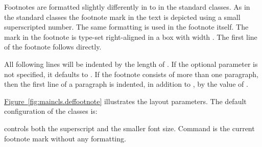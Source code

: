 \begin{Declaration}
\end{Declaration}%
Footnotes are formatted slightly differently in {\KOMAScript} to in the
standard classes. As in the standard classes the footnote mark in the text is
depicted using a small superscripted number. The same formatting is used in
the footnote itself. The mark in the footnote is type-set right-aligned in a
box with width . The first line of the footnote follows
directly.

All following lines will be indented by the length of . If the
optional parameter  is not specified, it defaults to
.  If the footnote consists of more than one paragraph, then the
first line of a paragraph is indented, in addition to , by the
value of .

\hyperref[fig:maincls.deffootnote]{Figure~\ref*{fig:maincls.deffootnote}} %
%
illustrates the layout parameters. The default configuration of the
{\KOMAScript} classes is:
\begin{lstcode}
    {\textsuperscript{\thefootnotemark}}
\end{lstcode}
 controls both the
superscript and the smaller font size. Command  is the
current footnote mark without any formatting.%
%

